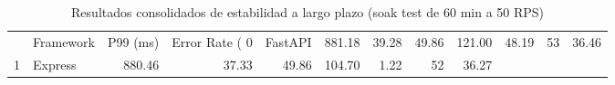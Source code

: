 \begin{table}
\caption{Resultados consolidados de estabilidad a largo plazo (soak test de 60 min a 50 RPS)}
\label{tab:soak_summary}
\begin{tabular}{llrrrrrrr}
 & Framework & P99 (ms) & Error Rate (%
0 & FastAPI & 881.18 & 39.28 & 49.86 & 121.00 & 48.19 & 53 & 36.46 \\
1 & Express & 880.46 & 37.33 & 49.86 & 104.70 & 1.22 & 52 & 36.27 \\
\end{tabular}
\end{table}
